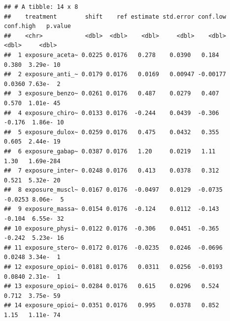 \documentclass[
]{article}
\begin{document}
\begin{verbatim}
## # A tibble: 14 x 8
##    treatment        shift    ref estimate std.error conf.low conf.high   p.value
##    <chr>            <dbl>  <dbl>    <dbl>     <dbl>    <dbl>     <dbl>     <dbl>
##  1 exposure_aceta~ 0.0225 0.0176   0.278    0.0390   0.184      0.380  3.29e- 10
##  2 exposure_anti_~ 0.0179 0.0176   0.0169   0.00947 -0.00177    0.0360 7.63e-  2
##  3 exposure_benzo~ 0.0261 0.0176   0.487    0.0279   0.407      0.570  1.01e- 45
##  4 exposure_chiro~ 0.0133 0.0176  -0.244    0.0439  -0.306     -0.176  1.86e- 10
##  5 exposure_dulox~ 0.0259 0.0176   0.475    0.0432   0.355      0.605  2.44e- 19
##  6 exposure_gabap~ 0.0387 0.0176   1.20     0.0219   1.11       1.30   1.69e-284
##  7 exposure_inter~ 0.0248 0.0176   0.413    0.0378   0.312      0.521  5.32e- 20
##  8 exposure_muscl~ 0.0167 0.0176  -0.0497   0.0129  -0.0735    -0.0253 8.06e-  5
##  9 exposure_massa~ 0.0154 0.0176  -0.124    0.0112  -0.143     -0.104  6.55e- 32
## 10 exposure_physi~ 0.0122 0.0176  -0.306    0.0451  -0.365     -0.242  5.23e- 16
## 11 exposure_stero~ 0.0172 0.0176  -0.0235   0.0246  -0.0696     0.0248 3.34e-  1
## 12 exposure_opioi~ 0.0181 0.0176   0.0311   0.0256  -0.0193     0.0840 2.31e-  1
## 13 exposure_opioi~ 0.0284 0.0176   0.615    0.0296   0.524      0.712  3.75e- 59
## 14 exposure_opioi~ 0.0351 0.0176   0.995    0.0378   0.852      1.15   1.11e- 74
\end{verbatim}
\end{document}
